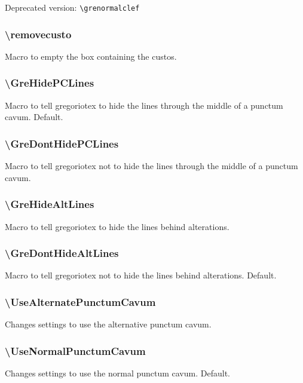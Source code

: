 \smallskip\indent Deprecated version: \verb=\grenormalclef=

\subsubsection*{\textbackslash removecusto}
Macro to empty the box containing the custos.

\subsubsection*{\textbackslash GreHidePCLines}
Macro to tell gregoriotex to hide the lines through the middle of a
punctum cavum.  Default.

\subsubsection*{\textbackslash GreDontHidePCLines}
Macro to tell gregoriotex not to hide the lines through the middle of
a punctum cavum.

\subsubsection*{\textbackslash GreHideAltLines}	
Macro to tell gregoriotex to hide the lines behind alterations.

\subsubsection*{\textbackslash GreDontHideAltLines}
Macro to tell gregoriotex not to hide the lines behind alterations.
Default.

\subsubsection*{\textbackslash UseAlternatePunctumCavum}
Changes settings to use the alternative punctum cavum.

\subsubsection*{\textbackslash UseNormalPunctumCavum}
Changes settings to use the normal punctum cavum.  Default.

